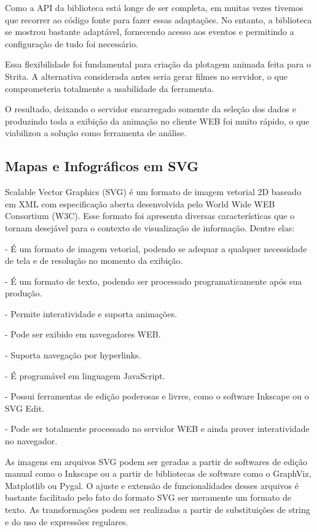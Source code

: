\documentclass[]{article}
\begin{document}
Como a API da biblioteca está longe de ser completa, em muitas vezes tivemos que recorrer ao código fonte para fazer essas adaptações. No entanto, a biblioteca se mostrou bastante adaptável, fornecendo acesso aos eventos e permitindo a configuração de tudo foi necessário.

Essa flexibilidade foi fundamental para criação da plotagem animada feita para o Strita. A alternativa considerada antes seria gerar filmes no servidor, o que comprometeria totalmente a usabilidade da ferramenta. 

O resultado, deixando o servidor encarregado somente da seleção dos dados e produzindo toda a exibição da animação no cliente WEB foi muito rápido, o que viabilizou a solução como ferramenta de análise.

\subsection{Mapas e Infográficos em SVG}

Scalable Vector Graphics (SVG) \cite{SVG:Online} é um formato de imagem vetorial 2D baseado em XML com especificação aberta desenvolvida pelo  World Wide WEB Consortium (W3C). Esse formato foi apresenta diversas características que o tornam desejável para o contexto de visualização de informação. Dentre elas:

- É um formato de imagem vetorial, podendo se adequar a qualquer necessidade de tela e de resolução no momento da exibição. 

- É um formato de texto, podendo ser processado programaticamente após sua produção.

- Permite interatividade e suporta animações.

- Pode ser exibido em navegadores WEB.

- Suporta navegação por hyperlinks.

- É programável em linguagem JavaScript.

- Possui ferramentas de edição poderosas e livres, como o software Inkscape ou o SVG Edit.

- Pode ser totalmente processado no servidor WEB e ainda prover interatividade no navegador.

As imagens em arquivos SVG podem ser geradas a partir de softwares de edição manual como o Inkscape ou a partir de bibliotecas de software como o GraphViz, Matplotlib ou Pygal. O ajuste e extensão de funcionalidades desses arquivos é bastante facilitado pelo fato do formato SVG ser meramente um formato de texto. As transformações podem ser realizadas a partir de substituições de string e do uso de expressões regulares. 
\end{document}
